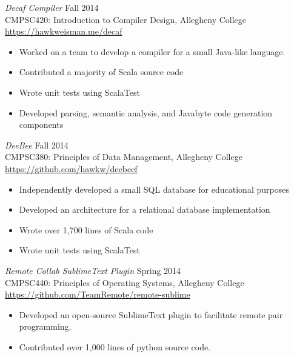 \documentclass[margin]{res}
\begin{document}
\begin{resume}
		{\sl Decaf Compiler} \hfill Fall 2014 \\
        		CMPSC420: Introduction to Compiler Design, Allegheny College \\ 
		\url{https://hawkweisman.me/decaf}
		\begin{itemize} \itemsep -2pt %
		\item Worked on a team to develop a compiler for a small Java-like language.
		\item Contributed a majority of Scala source code
		\item Wrote unit tests using ScalaTest
		\item Developed parsing, semantic analysis, and Javabyte code generation components
		\end{itemize}
		
		{\sl DeeBee} \hfill Fall 2014 \\
        		CMPSC380: Principles of Data Management, Allegheny College \\ 
		\url{https://github.com/hawkw/deebeef}
		\begin{itemize} \itemsep -2pt %
		\item Independently developed a small SQL database for educational purposes
		\item Developed an architecture for a relational database implementation
		\item Wrote over 1,700 lines of Scala code
		\item Wrote unit tests using ScalaTest
		\end{itemize}
		
		{\sl Remote Collab SublimeText Plugin } \hfill Spring 2014 \\
		CMPSC440: Principles of Operating Systems, Allegheny College \\
		\url{https://github.com/TeamRemote/remote-sublime}
		\begin{itemize}  \itemsep -2pt %
			\item Developed an open-source SublimeText plugin to facilitate remote pair programming.
			\item Contributed over 1,000 lines of python source code.
		\end{itemize}
		

\end{resume}
\end{document}

